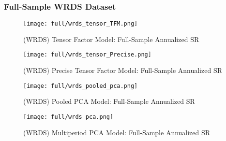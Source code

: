 \subsubsection{Full-Sample WRDS Dataset}

\begin{figure}[H]
    \centering
    \texttt{[image: full/wrds\_tensor\_TFM.png]}
    \caption{(WRDS) Tensor Factor Model: Full-Sample Annualized SR}
    \label{fig:wrds-primary-tfm}
\end{figure}

\begin{figure}[H]
    \centering
    \texttt{[image: full/wrds\_tensor\_Precise.png]}
    \caption{(WRDS) Precise Tensor Factor Model: Full-Sample Annualized SR}
    \label{fig:wrds-primary-precise}
\end{figure}

\begin{figure}[H]
    \centering
    \texttt{[image: full/wrds\_pooled\_pca.png]}
    \caption{(WRDS) Pooled PCA Model: Full-Sample Annualized SR}
    \label{fig:wrds-primary-pooled-pca}
\end{figure}

\begin{figure}[H]
    \centering
    \texttt{[image: full/wrds\_pca.png]}
    \caption{(WRDS) Multiperiod PCA Model: Full-Sample Annualized SR}
    \label{fig:wrds-primary-pca}
\end{figure}
